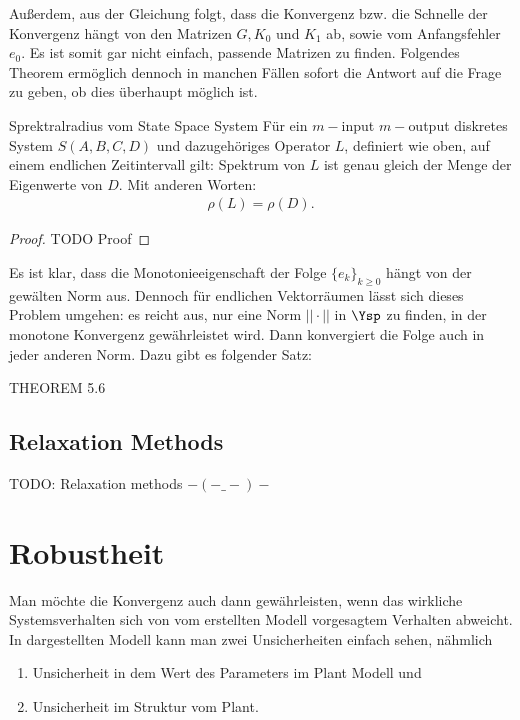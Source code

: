 Außerdem, aus der Gleichung folgt, dass die Konvergenz bzw. die Schnelle der Konvergenz hängt von den Matrizen $G, K_0$ und $K_1$ ab, sowie vom Anfangsfehler $e_0$. Es ist somit gar nicht einfach, passende Matrizen zu finden. Folgendes Theorem ermöglich dennoch in manchen Fällen sofort die Antwort auf die Frage zu geben, ob dies überhaupt möglich ist. 

\begin{theorem}{Sprektralradius vom State Space System}
Für ein $m-$input $m-$output diskretes System $S(A, B, C, D)$ und dazugehöriges Operator $L$, definiert wie oben, auf einem endlichen Zeitintervall gilt: Spektrum von $L$ ist genau gleich der Menge der Eigenwerte von $D$. Mit anderen Worten:
\begin{align}
\rho(L) = \rho(D).
\end{align}
\end{theorem}
\begin{proof}
	TODO Proof
\end{proof}

Es ist klar, dass die Monotonieeigenschaft der Folge $\{e_k\}_{k\geq 0}$ hängt von der gewälten Norm aus. Dennoch für endlichen Vektorräumen lässt sich dieses Problem umgehen: es reicht aus, nur eine Norm $|| \cdot ||$ in $\Ysp$ zu finden, in der monotone Konvergenz gewährleistet wird. Dann konvergiert die Folge auch in jeder anderen Norm. Dazu gibt es folgender Satz:%
\begin{theorem}
	
	THEOREM 5.6
\end{theorem}


\subsection{Relaxation Methods}
TODO: Relaxation methods $-(-\_-)-$

\section{Robustheit}
Man möchte die Konvergenz auch dann gewährleisten, wenn das wirkliche Systemsverhalten sich von vom erstellten Modell vorgesagtem Verhalten abweicht. In dargestellten Modell kann man zwei Unsicherheiten einfach sehen, nähmlich 
\begin{enumerate}
	\item Unsicherheit in dem Wert des Parameters im Plant Modell und 
	\item Unsicherheit im Struktur vom Plant. 
\end{enumerate}

